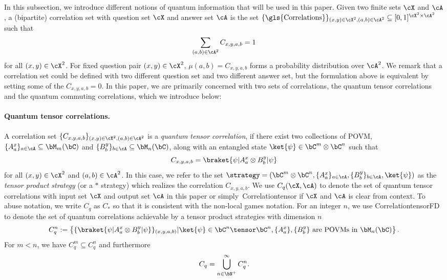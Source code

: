 In this subsection, we introduce different notions of quantum information that will be used in this paper. Given two finite sets $\cX$ and $\cA$, a (bipartite) correlation set with question set $\cX$ and answer set $\cA$ is the set $\{\text{\gls{Correlations}}\}_{(x,y) \in \cX^2, (a,b) \in \cA^2} \subseteq [0,1]^{\cX^2 \times \cA^2}$ such that 
\begin{equation*}
	\sum_{(a,b) \in \cA^2} C_{x,y,a,b} = 1
\end{equation*}
for all $(x,y) \in \cX^2$. For fixed question pair $(x,y) \in \cX^2$, $\mu(a,b) = C_{x,y,a,b}$ forms a probability distribution over $\cA^2$. We remark that a correlation set could be defined with two different question set and two different answer set, but the formulation above is equivalent by setting some of the $ C_{x,y,a,b} = 0$. In this paper, we are primarily concerned with two sets of correlations, the quantum tensor correlations and the quantum commuting correlations, which we introduce below:

\paragraph{Quantum tensor correlations. }A correlation set $\{C_{x,y,a,b}\}_{(x,y) \in \cX^2, (a,b) \in \cA^2}$ is a \textit{quantum tensor correlation}, if there exist two collections of POVM, $\{ A^x_a \}_{a \in \cA} \subseteq \bM_m(\bC)$ and $\{ B^y_b \}_{b \in \cA} \subseteq \bM_n(\bC)$, along with an entangled state $\ket{\psi} \in \bC^m \otimes \bC^n$ such that 
\begin{equation*}
	C_{x,y,a,b} = \braket{\psi|A_a^x \otimes  B_b^y|\psi}
\end{equation*}
for all $(x,y) \in \cX^2$ and $(a,b) \in \cA^2$. In this case, we refer to the set $\strategy= ( \bC^m \otimes \bC^n, \{ A^x_a \}_{a \in \cA}, \{ B^y_b \}_{b \in \cA}, \ket{\psi})$ as the \textit{tensor product strategy} (or a $*$ strategy) which realizes the correlation $C_{x,y,a,b}$. We use $C_q(\cX, \cA)$ to denote the set of quantum tensor correlations with input set $\cX$ and output set $\cA$ in this paper or simply~\gls{Correlationtensor} if $\cX$ and $\cA$ is clear from context. To abuse notation, we write $C_q$ as $C_*$ so that it is consistent with the non-local games notation. For an integer $n$, we use \gls{CorrelationtensorFD} to denote the set of quantum correlations achievable by a tensor product strategies with dimension $n$
\begin{equation*}
	C_{q}^n:= \left\{ \{\braket{\psi|A_a^x \otimes B_b^y|\psi}\}_{(x,y,a,b)} | \ket{\psi} \in \bC^n \tensor \bC^n,  \{A_a^x\}, \{B^y_b\} \text{ are POVMs in } \bM_n(\bC)    \right\}.
\end{equation*}
For $m < n$, we have $C_q^m \subseteq C_q^n$ and furthermore
\begin{equation*}
	C_q = \bigcup_{n \in \bN^{+}}^{\infty} C_q^n.
\end{equation*}


